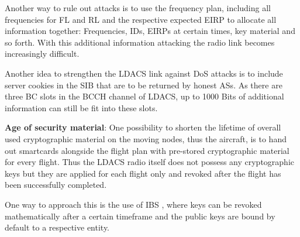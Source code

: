 Another way to rule out attacks is to use the frequency plan, including all frequencies for \ac{FL} and \ac{RL} and the respective expected \ac{EIRP} to allocate all information together: Frequencies, IDs, EIRPs at certain times, key material and so forth. With this additional information attacking the radio link becomes increasingly difficult.

Another idea to strengthen the \ac{LDACS} link against \ac{DoS} attacks is to include server cookies in the \ac{SIB} that are to be returned by honest ASs. As there are three \ac{BC} slots in the \ac{BCCH} channel of LDACS, up to 1000 Bits of additional information can still be fit into these slots.


\vspace{0.5em}
\textbf{Age of security material}: One possibility to shorten the lifetime of overall used cryptographic material on the moving nodes, thus the aircraft, is to hand out smartcards alongside the flight plan with pre-stored cryptographic material for every flight. Thus the LDACS radio itself does not possess any cryptographic keys but they are applied for each flight only and revoked after the flight has been successfully completed.

One way to approach this is the use of \ac{IBS} \cite{paterson2006}, where keys can be revoked mathematically after a certain timeframe and the public keys are bound by default to a respective entity. 